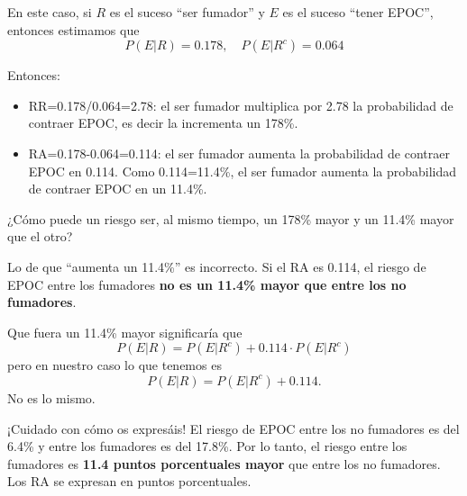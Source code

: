 \documentclass[
]{book}
\theoremstyle{definition}
\theoremstyle{definition}
\theoremstyle{definition}
\theoremstyle{definition}
\theoremstyle{remark}
\begin{document}
En este caso, si \(R\) es el suceso ``ser fumador'' y \(E\) es el suceso ``tener EPOC'', entonces estimamos que
\[
P(E|R)=0.178,\quad P(E|R^c)=0.064
\]

Entonces:

\begin{itemize}
\item
  RR=0.178/0.064=2.78: el ser fumador multiplica por 2.78 la probabilidad de contraer EPOC, es decir la incrementa un 178\%.
\item
  RA=0.178-0.064=0.114: el ser fumador aumenta la probabilidad de contraer EPOC en 0.114. Como 0.114=11.4\%, el ser fumador aumenta la probabilidad de contraer EPOC en un 11.4\%.
\end{itemize}

\begin{rmderror}
¿Cómo puede un riesgo ser, al mismo tiempo, un 178\% mayor y un 11.4\% mayor que el otro?

Lo de que ``aumenta un 11.4\%'' es incorrecto. Si el RA es 0.114, el riesgo de EPOC entre los fumadores \textbf{no es un 11.4\% mayor que entre los no fumadores}.

Que fuera un 11.4\% mayor significaría que
\[
P(E|R)=P(E|R^c)+0.114\cdot P(E|R^c)
\]
pero en nuestro caso lo que tenemos es
\[
P(E|R)=P(E|R^c)+0.114.
\]
No es lo mismo.
\end{rmderror}

\begin{rmdimportant}
¡Cuidado con cómo os expresáis! El riesgo de EPOC entre los no fumadores es del 6.4\% y entre los fumadores es del 17.8\%. Por lo tanto, el riesgo entre los fumadores es \textbf{11.4 puntos porcentuales mayor} que entre los no fumadores. Los RA se expresan en puntos porcentuales.
\end{rmdimportant}
\end{document}
